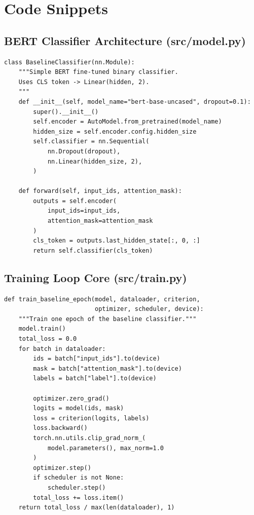 \documentclass[11pt]{article}
\begin{document}
\appendix
\section{Code Snippets}
\label{sec:appendix}

\subsection{BERT Classifier Architecture (src/model.py)}

\begin{lstlisting}[style=python]
class BaselineClassifier(nn.Module):
    """Simple BERT fine-tuned binary classifier.
    Uses CLS token -> Linear(hidden, 2).
    """
    def __init__(self, model_name="bert-base-uncased", dropout=0.1):
        super().__init__()
        self.encoder = AutoModel.from_pretrained(model_name)
        hidden_size = self.encoder.config.hidden_size
        self.classifier = nn.Sequential(
            nn.Dropout(dropout),
            nn.Linear(hidden_size, 2),
        )

    def forward(self, input_ids, attention_mask):
        outputs = self.encoder(
            input_ids=input_ids,
            attention_mask=attention_mask
        )
        cls_token = outputs.last_hidden_state[:, 0, :]
        return self.classifier(cls_token)
\end{lstlisting}

\subsection{Training Loop Core (src/train.py)}

\begin{lstlisting}[style=python]
def train_baseline_epoch(model, dataloader, criterion,
                         optimizer, scheduler, device):
    """Train one epoch of the baseline classifier."""
    model.train()
    total_loss = 0.0
    for batch in dataloader:
        ids = batch["input_ids"].to(device)
        mask = batch["attention_mask"].to(device)
        labels = batch["label"].to(device)

        optimizer.zero_grad()
        logits = model(ids, mask)
        loss = criterion(logits, labels)
        loss.backward()
        torch.nn.utils.clip_grad_norm_(
            model.parameters(), max_norm=1.0
        )
        optimizer.step()
        if scheduler is not None:
            scheduler.step()
        total_loss += loss.item()
    return total_loss / max(len(dataloader), 1)
\end{lstlisting}
\end{document}
